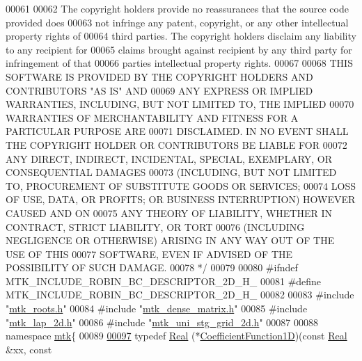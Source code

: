 \begin{DoxyCode}
00061 \textcolor{comment}{}
00062 \textcolor{comment}{The copyright holders provide no reassurances that the source code provided does}
00063 \textcolor{comment}{not infringe any patent, copyright, or any other intellectual property rights of}
00064 \textcolor{comment}{third parties. The copyright holders disclaim any liability to any recipient for}
00065 \textcolor{comment}{claims brought against recipient by any third party for infringement of that}
00066 \textcolor{comment}{parties intellectual property rights.}
00067 \textcolor{comment}{}
00068 \textcolor{comment}{THIS SOFTWARE IS PROVIDED BY THE COPYRIGHT HOLDERS AND CONTRIBUTORS "AS IS" AND}
00069 \textcolor{comment}{ANY EXPRESS OR IMPLIED WARRANTIES, INCLUDING, BUT NOT LIMITED TO, THE IMPLIED}
00070 \textcolor{comment}{WARRANTIES OF MERCHANTABILITY AND FITNESS FOR A PARTICULAR PURPOSE ARE}
00071 \textcolor{comment}{DISCLAIMED. IN NO EVENT SHALL THE COPYRIGHT HOLDER OR CONTRIBUTORS BE LIABLE FOR}
00072 \textcolor{comment}{ANY DIRECT, INDIRECT, INCIDENTAL, SPECIAL, EXEMPLARY, OR CONSEQUENTIAL DAMAGES}
00073 \textcolor{comment}{(INCLUDING, BUT NOT LIMITED TO, PROCUREMENT OF SUBSTITUTE GOODS OR SERVICES;}
00074 \textcolor{comment}{LOSS OF USE, DATA, OR PROFITS; OR BUSINESS INTERRUPTION) HOWEVER CAUSED AND ON}
00075 \textcolor{comment}{ANY THEORY OF LIABILITY, WHETHER IN CONTRACT, STRICT LIABILITY, OR TORT}
00076 \textcolor{comment}{(INCLUDING NEGLIGENCE OR OTHERWISE) ARISING IN ANY WAY OUT OF THE USE OF THIS}
00077 \textcolor{comment}{SOFTWARE, EVEN IF ADVISED OF THE POSSIBILITY OF SUCH DAMAGE.}
00078 \textcolor{comment}{*/}
00079 
00080 \textcolor{preprocessor}{#ifndef MTK\_INCLUDE\_ROBIN\_BC\_DESCRIPTOR\_2D\_H\_}
00081 \textcolor{preprocessor}{#define MTK\_INCLUDE\_ROBIN\_BC\_DESCRIPTOR\_2D\_H\_}
00082 
00083 \textcolor{preprocessor}{#include "\hyperlink{mtk__roots_8h}{mtk\_roots.h}"}
00084 \textcolor{preprocessor}{#include "\hyperlink{mtk__dense__matrix_8h}{mtk\_dense\_matrix.h}"}
00085 \textcolor{preprocessor}{#include "\hyperlink{mtk__lap__2d_8h}{mtk\_lap\_2d.h}"}
00086 \textcolor{preprocessor}{#include "\hyperlink{mtk__uni__stg__grid__2d_8h}{mtk\_uni\_stg\_grid\_2d.h}"}
00087 
00088 \textcolor{keyword}{namespace }\hyperlink{namespacemtk}{mtk}\{
00089 
\hypertarget{mtk__robin__bc__descriptor__2d_8h_source_l00097}{}\hyperlink{group__c07-mim__ops_gaa79593eeb6676d6011db339e01983909}{00097} \textcolor{keyword}{typedef} \hyperlink{group__c01-roots_gac080bbbf5cbb5502c9f00405f894857d}{Real} (*\hyperlink{group__c07-mim__ops_gaa79593eeb6676d6011db339e01983909}{CoefficientFunction1D})(\textcolor{keyword}{const} \hyperlink{group__c01-roots_gac080bbbf5cbb5502c9f00405f894857d}{Real} &xx, \textcolor{keyword}{const} 

\end{DoxyCode}
